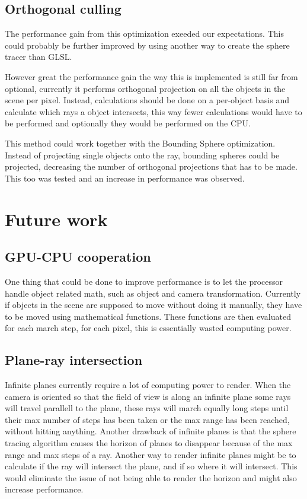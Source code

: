 		\subsection{Orthogonal culling}

			The performance gain from this optimization exeeded our 
			expectations. This could probably be further improved by using
			another way to create the sphere tracer than GLSL. 

			However great the performance gain the way this is implemented
			is still far from optional, currently it performs orthogonal 
			projection on all the objects in the scene per pixel. Instead,
			calculations should be done on a per-object basis and calculate
			which rays a object intersects, this way fewer calculations would
			have to be performed and optionally they would be performed on the
			CPU.

			This method could work together with the Bounding Sphere 
			optimization. Instead of projecting single objects onto the ray,
			bounding spheres could be projected, decreasing the number of 
			orthogonal projections that has to be made. This too was tested 
			and an increase in performance was observed.

	\section{Future work}

		\subsection{GPU-CPU cooperation}
		
			One thing that could be done to improve performance is to let the
			processor handle object related math, such as object and camera 
			transformation. Currently if objects in the scene are supposed to 
			move without doing it manually, they have to be moved using 
			mathematical functions. These functions are then evaluated for 
			each march step, for each pixel, this is essentially wasted 
			computing power.


		\subsection{Plane-ray intersection}

			Infinite planes currently require a lot of computing power to
			render. When the camera is oriented so that the field of view is
			along an infinite plane some rays will travel parallell to the
			plane, these rays will march equally long steps until their max
			number of steps has been taken or the max range has been reached,
			without hitting anything. Another drawback of infinite planes is
			that the sphere tracing algorithm causes the horizon of planes to
			disappear because of the max range and max steps of a ray. Another
			way to render infinite planes might be to calculate if the ray will
			intersect the plane, and if so where it will intersect. This would
			eliminate the issue of not being able to render the horizon and
			might also increase performance.

